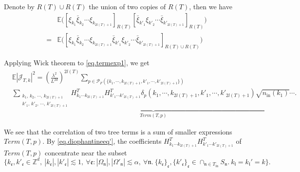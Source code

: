 Denote by $R(T)\cup R(T)$ the union of two copies of $R(T)$, then we have 
\begin{equation}
    \begin{split}
    &\mathbb{E}\Big([\xi_{k_1}\bar{\xi}_{k_2}\cdots\xi_{k_{2l(T)+1}}]_{R(T)}
    [\bar{\xi}_{k'_1}\xi_{k'_2}\cdots\bar{\xi}_{k'_{2l(T)+1}}]_{R(T)}\Big) 
    \\
    =& \mathbb{E}\Big([\xi_{k_1}\bar{\xi}_{k_2}\cdots\xi_{k_{2l(T)+1}}\bar{\xi}_{k'_1}\xi_{k'_2}\cdots\bar{\xi}_{k'_{2l(T)+1}}]_{R(T)\cup R(T)}\Big)
    \end{split}
\end{equation}

Applying Wick theorem to \eqref{eq.termexp1}, we get
\begin{equation}\label{eq.termexp'}
\begin{split}
    &\mathbb{E}|\mathcal{J}_{T,k}|^2=\left(\frac{\lambda^2}{L^{2d}}\right)^{2l(T)}
    \sum_{p\in \mathcal{P}_F(\{k_1,\cdots, k_{2l(T)+1}, k'_1,\cdots, k'_{2l(T)+1}\})}
    \\[0.5em]
    & \underbrace{\sum_{\substack{k_1,\, k_2,\, \cdots,\, k_{2l(T)+1}\\k'_1,\, k'_2,\, \cdots,\, k'_{2l(T)+1}}}
    H^T_{k_1\cdots k_{2l(T)+1}} H^{T}_{k'_1\cdots k'_{2l(T)+1}} \delta_{p}(k_1,\cdots, k_{2l(T)+1}, k'_1,\cdots, k'_{2l(T)+1})\sqrt{n_{\textrm{in}}(k_1)}\cdots}_{Term(T, p)}.
\end{split}
\end{equation}

We see that the correlation of two tree terms is a sum of smaller expressions $Term(T, p)$. By \eqref{eq.diophantineeq'}, the coefficients $H^T_{k_1\cdots k_{2l(T)+1}} H^{T}_{k'_1\cdots k'_{2l(T)+1}}$ of $Term(T, p)$ concentrate near the subset 
\begin{equation}\label{eq.diophantineequnpaired}
    \{k_{\mathfrak{e}}, k'_{\mathfrak{e}}\in \mathbb{Z}^d,\ |k_{\mathfrak{e}}|, |k'_{\mathfrak{e}}|\lesssim 1,\ \forall \mathfrak{e}: |\Omega_{\mathfrak{n}}|,|\Omega'_{\mathfrak{n}}|\lesssim \alpha,\ \forall \mathfrak{n}. \ \{k_{\mathfrak{e}}\}_{\mathfrak{e}}, \{k'_{\mathfrak{e}}\}_{\mathfrak{e}}\in \cap_{\mathfrak{n}\in T_{\text{in}}} S_{\mathfrak{n}}.\ k_{\mathfrak{l}}=k_{\mathfrak{l}}'=k\}.
\end{equation}

